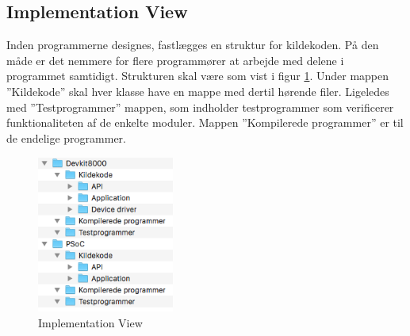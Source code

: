 \subsection{Implementation View}
Inden programmerne designes, fastlægges en struktur for kildekoden. På den måde er det nemmere for flere programmører at arbejde med delene i programmet samtidigt.
Strukturen skal være som vist i figur \ref{fig:ImplementationView}. Under mappen ”Kildekode” skal hver klasse have en mappe med dertil hørende filer. Ligeledes med ”Testprogrammer” mappen, som indholder testprogrammer som verificerer funktionaliteten af de enkelte moduler. Mappen ”Kompilerede programmer” er til de endelige programmer.
\begin{figure}[H] \centering
    \includegraphics[width=0.4\textwidth]{0_Filer/Figuer/ImplementationView.png}
    \caption{Implementation View}
    \label{fig:ImplementationView}
\end{figure}
